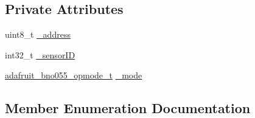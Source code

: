 \subsection*{Private Attributes}
\begin{DoxyCompactItemize}
\item 
uint8\+\_\+t \hyperlink{classAdafruit__BNO055_ad95a29d56e6ac5fcb573ed579553a42c}{\+\_\+address}
\item 
int32\+\_\+t \hyperlink{classAdafruit__BNO055_acc0316c669b1af8741e04e1aa63d1118}{\+\_\+sensor\+ID}
\item 
\hyperlink{classAdafruit__BNO055_a1288643630f474aba977e4b1aa34456f}{adafruit\+\_\+bno055\+\_\+opmode\+\_\+t} \hyperlink{classAdafruit__BNO055_a1c26defe5670d925e5f735dba0b2a952}{\+\_\+mode}
\end{DoxyCompactItemize}


\subsection{Member Enumeration Documentation}
